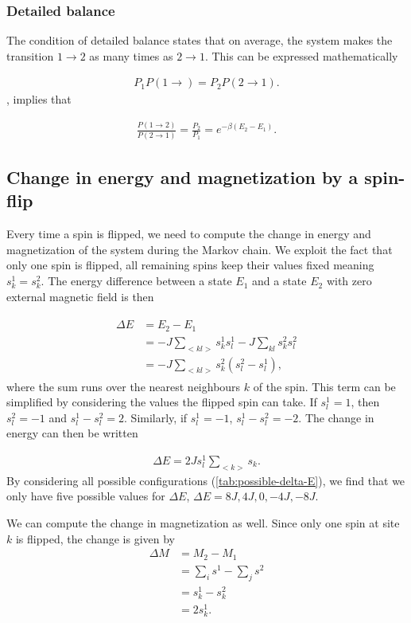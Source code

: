 \documentclass[../main.tex]{subfiles}
\begin{document}
\subsubsection{Detailed balance}
The condition of detailed balance states that on average, the system makes the transition \ensuremath{1\rightarrow2} as many times as \ensuremath{2\rightarrow1}. This can be expressed mathematically 

\begin{align}
    P_1P(1\rightarrow)=P_2P(2\rightarrow1).
    \label{eq:detailed-balance}
\end{align} , implies that

\begin{align}
    \frac{P(1\rightarrow2)}{P(2\rightarrow1)}=\frac{P_2}{P_1}=e^{-\beta(E_2-E_1)}.
\end{align}

\subsection{Change in energy and magnetization by a spin-flip}\label{sec:energy-magnetization-change}
Every time a spin is flipped, we need to compute the change in energy and magnetization of the system during the Markov chain. We exploit the fact that only one spin is flipped, all remaining spins keep their values fixed meaning \ensuremath{s_k^1=s_k^2}. The energy difference between a state $E_1$ and a state $E_2$ with zero external magnetic field is then

\begin{align}
    \begin{split}
        \Delta E &= E_2-E_1 \\
        &=-J\sum_{<kl>}s_k^1s_l^1-J\sum_{kl}s_k^2s_l^2 \\
        &= -J\sum_{<kl>}s_k^2(s_l^2-s_l^1), 
    \end{split}
\end{align} where the sum runs over the nearest neighbours $k$ of the spin. This term can be simplified by considering the values the flipped spin can take. If $s_l^1=1$, then $s_l^2=-1$ and $s_l^1-s_l^2=2$. Similarly, if $s_l^1=-1$, $s_l^1-s_l^2=-2$. The change in energy can then be written

\begin{align}
    \Delta E = 2Js_l^1\sum_{<k>}s_k.
\end{align} By considering all possible configurations (\cref{tab:possible-delta-E}), we find that we only have five possible values for $\Delta E$, \ensuremath{\Delta E= 8J, 4J, 0, -4J, -8J}.

We can compute the change in magnetization as well. Since only one spin at site $k$ is flipped, the change is given by
\begin{align}
    \Delta M &= M_2-M_1 \\
    &= \sum_is^1-\sum_js^2 \\
    &= s_k^1-s_k^2 \\
    &= 2s_k^1.
\end{align}
\end{document}
